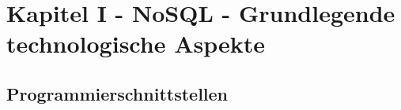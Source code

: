 \chapter{Kapitel I - NoSQL - Grundlegende technologische Aspekte}
\section{Programmierschnittstellen}




